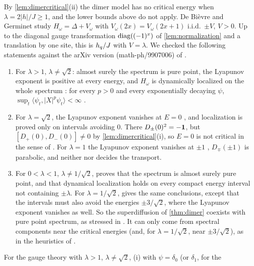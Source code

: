 \begin{remark}\label{rem:dimerstrong}
By \cref{lem:dimercritical}(ii) the dimer model has no critical energy when $\lambda=2|h|/J\ge1$, and
the lower bounds above do not apply.  De Bi\`evre and Germinet \cite{DeBievreGerminet2000} study
$H_\omega=\Delta+V_\omega$ with $V_\omega(2x)=V_\omega(2x+1)$ i.i.d.\ $\pm V$, $V>0$.  Up to the diagonal
gauge transformation $\operatorname{diag}((-1)^x)$ of \cref{lem:normalization} and a translation by one site, this
is $h_{q}/J$ with $V=\lambda$.
We checked the following statements against the arXiv version (math-ph/9907006) of
\cite{DeBievreGerminet2000}.
\begin{enumerate}[label=(\roman*)]
\item For $\lambda>1$, $\lambda\neq\sqrt2$: almost surely the spectrum is pure point, the Lyapunov exponent
is positive at every energy, and $H_\omega$ is dynamically localized on the whole spectrum
\cite[Thm.~2.3]{DeBievreGerminet2000}: for every $p>0$ and every exponentially decaying $\psi$,
$\sup_t\langle\psi_t,|X|^p\psi_t\rangle<\infty$ \cite[Def.~2.1, Thm.~2.2(iii)]{DeBievreGerminet2000}.
\item For $\lambda=\sqrt2$, the Lyapunov exponent vanishes at $E=0$ \cite[Thm.~2.4]{DeBievreGerminet2000},
and localization is proved only on intervals avoiding $0$.  There $D_\pm(0)^2=-\mathbf{1}$, but
$[D_+(0),D_-(0)]\neq0$ by \cref{lem:dimercritical}(i), so $E=0$ is not critical in the sense of
\cite{JSBS2003}.  For $\lambda=1$ the Lyapunov exponent vanishes at $\pm1$
\cite[Thm.~2.2(i)]{DeBievreGerminet2000}, $D_\mp(\pm1)$ is parabolic, and neither \cite{JSBS2003}
nor \cite{DeBievreGerminet2000} decides the transport.
\item For $0<\lambda<1$, $\lambda\neq1/\sqrt2$, \cite[Thm.~2.2]{DeBievreGerminet2000} proves that the
spectrum is almost surely pure point, and that dynamical localization holds on every compact energy
interval not containing $\pm\lambda$.  For $\lambda=1/\sqrt2$, \cite[Thm.~2.4]{DeBievreGerminet2000} gives
the same conclusions, except that the intervals must also avoid the energies $\pm3/\sqrt2$, where the
Lyapunov exponent vanishes as well.  So the superdiffusion of \cref{thm:dimer} coexists with pure
point spectrum, as stressed in \cite{JSBS2003}.  It can only come from spectral components near the
critical energies (and, for $\lambda=1/\sqrt2$, near $\pm3/\sqrt2$), as in the heuristics of
\cite{DWP1990}.
\end{enumerate}
For the gauge theory with $\lambda>1$, $\lambda\neq\sqrt2$, (i) with $\psi=\delta_0$ (or $\delta_1$, for the

\end{remark}

